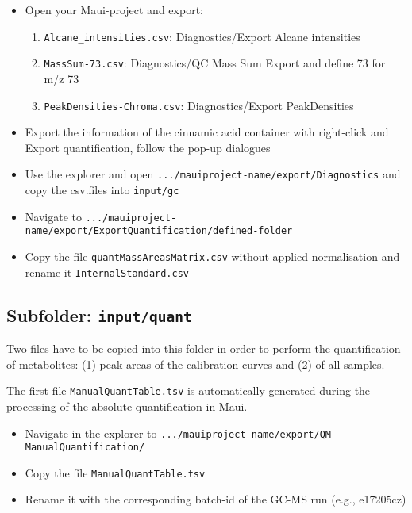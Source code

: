 \documentclass[]{book}
\providecommand{\tightlist}{%
  \setlength{\itemsep}{0pt}\setlength{\parskip}{0pt}}
\begin{document}
\begin{itemize}
\tightlist
\item
  Open your Maui-project and export:

  \begin{enumerate}
  \def\labelenumi{\arabic{enumi}.}
  \tightlist
  \item
    \texttt{Alcane\_intensities.csv}: Diagnostics/Export Alcane intensities
  \item
    \texttt{MassSum-73.csv}: Diagnostics/QC Mass Sum Export and define 73 for m/z 73
  \item
    \texttt{PeakDensities-Chroma.csv}: Diagnostics/Export PeakDensities
  \end{enumerate}
\item
  Export the information of the cinnamic acid container with right-click and Export quantification, follow the pop-up dialogues
\item
  Use the explorer and open \texttt{.../mauiproject-name/export/Diagnostics} and copy the csv.files into \texttt{input/gc}
\item
  Navigate to \texttt{.../mauiproject-name/export/ExportQuantification/defined-folder}
\item
  Copy the file \texttt{quantMassAreasMatrix.csv} without applied normalisation and rename it \texttt{InternalStandard.csv}
\end{itemize}

\hypertarget{subfolder-inputquant}{%
\subsection{\texorpdfstring{Subfolder: \texttt{input/quant}}{Subfolder: input/quant}}\label{subfolder-inputquant}}

Two files have to be copied into this folder in order to perform the quantification of metabolites: (1) peak areas of the calibration curves and (2) of all samples.

The first file \texttt{ManualQuantTable.tsv} is automatically generated during the processing of the absolute quantification in Maui.

\begin{itemize}
\tightlist
\item
  Navigate in the explorer to \texttt{.../mauiproject-name/export/QM-ManualQuantification/}
\item
  Copy the file \texttt{ManualQuantTable.tsv}
\item
  Rename it with the corresponding batch-id of the GC-MS run (e.g., e17205cz)
\end{itemize}
\end{document}
